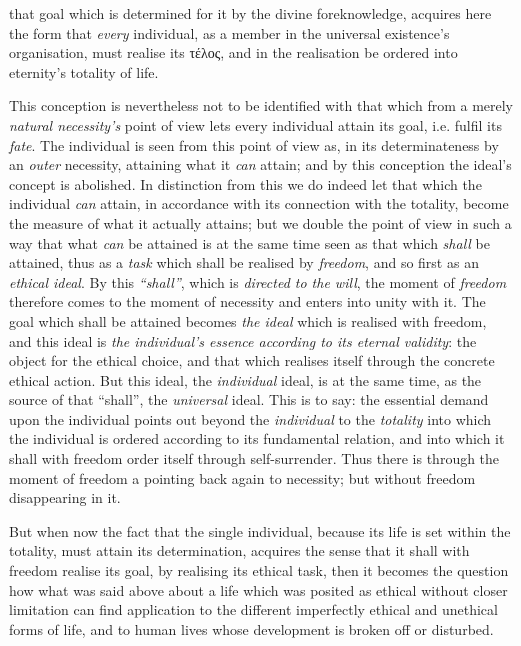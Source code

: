 \documentclass[12pt,a4paper]{book}
\begin{document}
that goal which is determined for it by the divine foreknowledge, acquires here
the form that \emph{every} individual, as a member in the universal existence's
organisation, must realise its τέλος, and in the realisation be ordered into
eternity's totality of life.

This conception is nevertheless not to be identified with that which from a
merely \emph{natural necessity's} point of view lets every individual attain its
goal, i.e. fulfil its \emph{fate}. The individual is seen from this point of
view as, in its determinateness by an \emph{outer} necessity, attaining what it
\emph{can} attain; and by this conception the ideal's concept is abolished. In
distinction from this we do indeed let that which the individual \emph{can}
attain, in accordance with its connection with the totality, become the measure
of what it actually attains; but we double the point of view in such a way that
what \emph{can} be attained is at the same time seen as that which \emph{shall}
be attained, thus as a \emph{task} which shall be realised by \emph{freedom},
and so first as an \emph{ethical ideal}. By this \emph{``shall''}, which is
\emph{directed to the will}, the moment of \emph{freedom} therefore comes to the
moment of necessity and enters into unity with it. The goal which shall be
attained becomes \emph{the ideal} which is realised with freedom, and this ideal
is \emph{the individual's essence according to its eternal validity}: the object
for the ethical choice, and that which realises itself through the concrete
ethical action. But this ideal, the \emph{individual} ideal, is at the same
time, as the source of that ``shall'', the \emph{universal} ideal. This is to
say: the essential demand upon the individual points out beyond the
\emph{individual} to the \emph{totality} into which the individual is ordered
according to its fundamental relation, and into which it shall with freedom
order itself through self-surrender. Thus there is through the moment of freedom
a pointing back again to necessity; but without freedom disappearing in it.

But when now the fact that the single individual, because its life is set within
the totality, must attain its determination, acquires the sense that it shall
with freedom realise its goal, by realising its ethical task, then it becomes
the question how what was said above about a
life which was posited as ethical without closer limitation can find application
to the different imperfectly ethical and unethical forms of life, and to human
lives whose development is broken off or disturbed.
\end{document}
